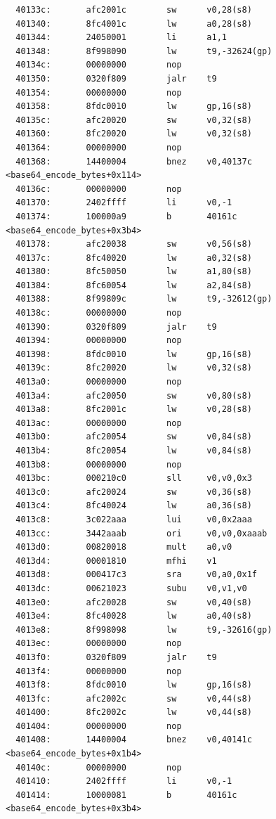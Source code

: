 \documentclass[11pt]{article}
\begin{document}
\begin{verbatim}
  40133c:       afc2001c        sw      v0,28(s8)
  401340:       8fc4001c        lw      a0,28(s8)
  401344:       24050001        li      a1,1
  401348:       8f998090        lw      t9,-32624(gp)
  40134c:       00000000        nop
  401350:       0320f809        jalr    t9
  401354:       00000000        nop
  401358:       8fdc0010        lw      gp,16(s8)
  40135c:       afc20020        sw      v0,32(s8)
  401360:       8fc20020        lw      v0,32(s8)
  401364:       00000000        nop
  401368:       14400004        bnez    v0,40137c <base64_encode_bytes+0x114>
  40136c:       00000000        nop
  401370:       2402ffff        li      v0,-1
  401374:       100000a9        b       40161c <base64_encode_bytes+0x3b4>
  401378:       afc20038        sw      v0,56(s8)
  40137c:       8fc40020        lw      a0,32(s8)
  401380:       8fc50050        lw      a1,80(s8)
  401384:       8fc60054        lw      a2,84(s8)
  401388:       8f99809c        lw      t9,-32612(gp)
  40138c:       00000000        nop
  401390:       0320f809        jalr    t9
  401394:       00000000        nop
  401398:       8fdc0010        lw      gp,16(s8)
  40139c:       8fc20020        lw      v0,32(s8)
  4013a0:       00000000        nop
  4013a4:       afc20050        sw      v0,80(s8)
  4013a8:       8fc2001c        lw      v0,28(s8)
  4013ac:       00000000        nop
  4013b0:       afc20054        sw      v0,84(s8)
  4013b4:       8fc20054        lw      v0,84(s8)
  4013b8:       00000000        nop
  4013bc:       000210c0        sll     v0,v0,0x3
  4013c0:       afc20024        sw      v0,36(s8)
  4013c4:       8fc40024        lw      a0,36(s8)
  4013c8:       3c022aaa        lui     v0,0x2aaa
  4013cc:       3442aaab        ori     v0,v0,0xaaab
  4013d0:       00820018        mult    a0,v0
  4013d4:       00001810        mfhi    v1
  4013d8:       000417c3        sra     v0,a0,0x1f
  4013dc:       00621023        subu    v0,v1,v0
  4013e0:       afc20028        sw      v0,40(s8)
  4013e4:       8fc40028        lw      a0,40(s8)
  4013e8:       8f998098        lw      t9,-32616(gp)
  4013ec:       00000000        nop
  4013f0:       0320f809        jalr    t9
  4013f4:       00000000        nop
  4013f8:       8fdc0010        lw      gp,16(s8)
  4013fc:       afc2002c        sw      v0,44(s8)
  401400:       8fc2002c        lw      v0,44(s8)
  401404:       00000000        nop
  401408:       14400004        bnez    v0,40141c <base64_encode_bytes+0x1b4>
  40140c:       00000000        nop
  401410:       2402ffff        li      v0,-1
  401414:       10000081        b       40161c <base64_encode_bytes+0x3b4>

\end{verbatim}
\end{document}
